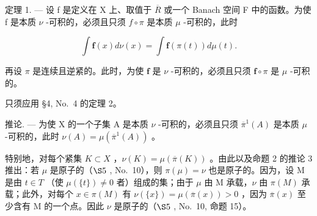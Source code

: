 定理 1. --- 设 f 是定义在 X 上、取值于 \(\overline{R}\) 或一个 Banach 空间 F 中的函数。为使 f 是本质 \(\nu\) -可积的，必须且只须 \(f \circ \pi\) 是本质 \(\mu\) -可积的，此时

\[
\int \mathbf {f} (x) d \nu (x) = \int \mathbf {f} (\pi (t)) d \mu (t).\tag{3}
\]

再设 \(\pi\) 是连续且逆紧的。此时，为使 \(\mathbf{f}\) 是 \(\nu\) -可积的，必须且只须 \(\mathbf{f} \circ \pi\) 是 \(\mu\) -可积的。

只须应用 §4, No.~4 的定理 2。

推论. --- 为使 X 的一个子集 A 是本质 \(\nu\) -可积的，必须且只须 \(\overline{\pi}^{1}(A)\) 是本质 \(\mu\) -可积的，此时 \(\nu(A)=\mu\left(\overline{\pi}^{1}(A)\right)\) 。

特别地，对每个紧集 \(K \subset X\) ，\(\nu(K) = \mu\left(\overline{\pi}(K)\right)\) 。由此以及命题 2 的推论 3 推出：若 \(\mu\) 是原子的（\(\S5\) , No.~10），则 \(\pi(\mu) = \nu\) 也是原子的。因为，设 M 是由 \(t \in T\) （使 \(\mu(\{t\}) \neq 0\) 者）组成的集；由于 \(\mu\) 由 M 承载，\(\nu\) 由 \(\pi(M)\) 承载；此外，对每个 \(x \in \pi(M)\) 有 \(\nu(\{x\}) = \mu\left(\overline{\pi}(x)\right) > 0\) ，因为 \(\overline{\pi}(x)\) 至少含有 M 的一个点。因此 \(\nu\) 是原子的（\(\S5\) , No.~10, 命题 15）。

